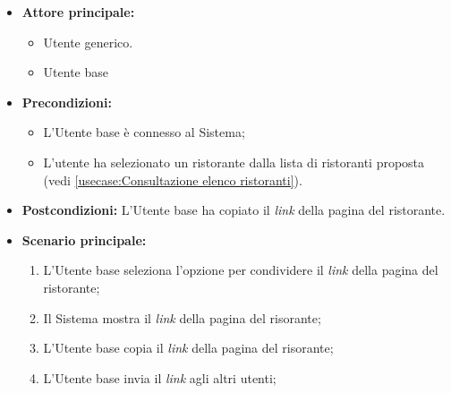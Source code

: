 \label{usecase:Condivisione link del ristorante}
\begin{itemize}
    \item \textbf{Attore principale:}    
	\begin{itemize}
        \item Utente generico.
        \item Utente base
    \end{itemize}

	\item \textbf{Precondizioni:}
	\begin{itemize}
		\item L'Utente base è connesso al Sistema;
		\item L'utente ha selezionato un ristorante dalla lista di ristoranti proposta (vedi \autoref{usecase:Consultazione elenco ristoranti}).
	\end{itemize}

	\item \textbf{Postcondizioni:}
	      L'Utente base ha copiato il \textit{link} della pagina del ristorante.

	\item \textbf{Scenario principale:}
	      \begin{enumerate}
		      \item L'Utente base seleziona l'opzione per condividere il \textit{link} della pagina del ristorante;
		      \item Il Sistema mostra il \textit{link} della pagina del risorante;
		      \item L'Utente base copia il \textit{link} della pagina del risorante;
		      \item L'Utente base invia il \textit{link} agli altri utenti;
	      \end{enumerate}
\end{itemize}